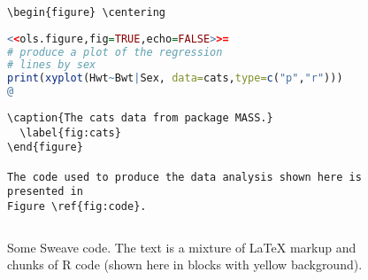 \documentclass[11pt]{article}
\begin{document}
\begin{figure}
\begin{lstlisting}[language={[latex]tex},numbers=none,style=sweave-tex]
\begin{figure} \centering
\end{lstlisting}
\begin{lstlisting}[language=R,numbers=none,style=sweave-r]
<<ols.figure,fig=TRUE,echo=FALSE>>= 
# produce a plot of the regression
# lines by sex 
print(xyplot(Hwt~Bwt|Sex, data=cats,type=c("p","r"))) 
@
\end{lstlisting}
\begin{lstlisting}[language={[latex]tex},numbers=none,style=sweave-tex]
  \caption{The cats data from package MASS.}
  \label{fig:cats}
\end{figure}
 
The code used to produce the data analysis shown here is presented in
Figure \ref{fig:code}.
\end{lstlisting}
\begin{lstlisting}[style=sweave-bottom]

\end{lstlisting}
  \caption{Some Sweave code. The text is a mixture of LaTeX markup and
chunks of R code (shown here in blocks with yellow background).}
\label{fig:code}
\end{figure}
 
\end{document}
